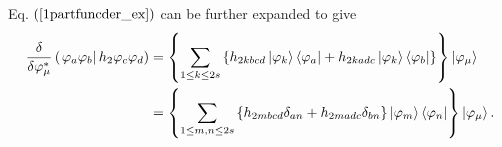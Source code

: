 \documentclass{preprint}
\begin{document}
Eq. $\left( \ref{1partfuncder_ex}\right) $ can be further expanded to give
\begin{align}
\frac{\delta}{\delta\varphi_{\mu}^{\ast}}\left( \left.
\varphi_{a}\varphi_{b}\right\vert h_{2}\varphi_{c}\varphi_{d}\right) &
=\left\{ \sum_{1\leq k\leq2s}\left\{ h_{2kbcd}\left\vert
\varphi_{k}\right\rangle \left\langle \varphi_{a}\right\vert
+h_{2kadc}\left\vert \varphi _{k}\right\rangle \left\langle
\varphi_{b}\right\vert \right\} \right\} \left\vert
\varphi_{\mu}\right\rangle  \notag \\
& =\left\{ \sum_{1\leq m,n\leq2s}\left\{
h_{2mbcd}\delta_{an}+h_{2madc}\delta_{bn}\right\} \left\vert
\varphi_{m}\right\rangle \left\langle \varphi_{n}\right\vert \right\}
\left\vert \varphi_{\mu }\right\rangle .  \label{2partfuncder_ex}
\end{align}
\end{document}
